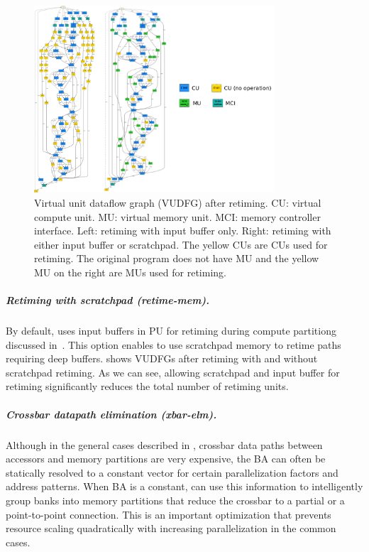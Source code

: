 \begin{figure}
\centering
\includegraphics[width=0.8\textwidth]{figs/retiming.pdf}
\caption[Retiming]{
  Virtual unit dataflow graph (VUDFG) after retiming. CU: virtual compute unit. MU: virtual memory
  unit. MCI: memory controller interface.
  Left: retiming with input buffer only. Right: retiming with either input buffer or scratchpad.
  The yellow CUs are CUs used for retiming. The original program does not have MU and the yellow MU
  on the right are MUs used for retiming. 
}
\label{fig:retiming}
\end{figure}
\subparagraph{Retiming with scratchpad (retime-mem).} 
By default, \name{} uses input buffers in PU for retiming during compute partitiong discussed
in~.
This option enables \name{} to use scratchpad memory to retime paths requiring deep buffers.
 shows VUDFGs after retiming with and without scratchpad retiming. As we can see,
allowing scratchpad and input buffer for retiming significantly reduces the total number of retiming
units.

\subparagraph{Crossbar datapath elimination (xbar-elm).}
Although in the general cases described in , 
crossbar data paths between accessors and memory partitions are very expensive, 
the BA can often be statically resolved to a constant vector for certain
parallelization factors and address patterns.  
When BA is a constant, \name{} can use this information to intelligently 
group banks into memory partitions that reduce the crossbar to a partial 
or a point-to-point connection.
This is an important optimization that prevents resource scaling quadratically with increasing
parallelization in the common cases.

